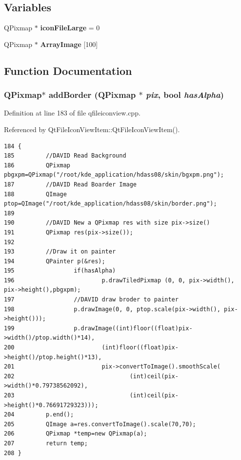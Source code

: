 \subsection*{Variables}
\begin{CompactItemize}
\item 
QPixmap $\ast$ {\bf icon\-File\-Large} = 0
\item 
QPixmap $\ast$ {\bf Array\-Image} [100]
\end{CompactItemize}


\subsection{Function Documentation}
\subsubsection{\setlength{\rightskip}{0pt plus 5cm}QPixmap$\ast$ add\-Border (QPixmap $\ast$ {\em pix}, bool {\em has\-Alpha})}\label{qfileiconview_8cpp_a3}




Definition at line 183 of file qfileiconview.cpp.

Referenced by Qt\-File\-Icon\-View\-Item::Qt\-File\-Icon\-View\-Item().



\footnotesize\begin{verbatim}184 {
185         //DAVID Read Background
186         QPixmap pbgxpm=QPixmap("/root/kde_application/hdass08/skin/bgxpm.png");
187         //DAVID Read Boarder Image
188         QImage ptop=QImage("/root/kde_application/hdass08/skin/border.png");
189         
190         //DAVID New a QPixmap res with size pix->size()
191         QPixmap res(pix->size());
192         
193         //Draw it on painter
194         QPainter p(&res);
195                 if(hasAlpha) 
196                         p.drawTiledPixmap (0, 0, pix->width(), pix->height(),pbgxpm);
197                 //DAVID draw broder to painter          
198                 p.drawImage(0, 0, ptop.scale(pix->width(), pix->height()));
199                 p.drawImage((int)floor((float)pix->width()/ptop.width()*14),
200                         (int)floor((float)pix->height()/ptop.height()*13),
201                         pix->convertToImage().smoothScale(
202                                 (int)ceil(pix->width()*0.79738562092),
203                                 (int)ceil(pix->height()*0.76691729323)));
204         p.end();
205         QImage a=res.convertToImage().scale(70,70);
206         QPixmap *temp=new QPixmap(a);
207         return temp;
208 }
\end{verbatim}\normalsize 
{}
